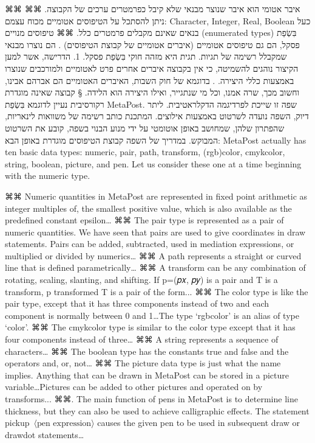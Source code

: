       ⌘⌘ איבר אטומי הוא איבר שנוצר מבנאי שלא קיבל כפרמטרים ערכים של הקבוצה.
      ⌘⌘ ניתן להסתכל על הטיפוסים אטומיים מכוח עצמם: Character, Integer, Real, Boolean כעל בנאים שאינם מקבלים פרמטרים כלל.
      ⌘⌘ טיפוסים מנויים (enumerated types) בִּשְׂפַת פסקל, הם גם טיפוסים אטומיים (איברים אטומיים של קבוצת הטיפוסים) . הם נוצרו מבנאי שמקבלל רשימה של תגיות. תגית היא מזהה חוקי בִּשְׂפַת פסקל.
      1. הדרישה, אשר למען הקיצור נוהגים להשמיטה, כי אין בקבוצה איברים אחרים פרט לאטומיים ולמורכבים שנוצרו באמצעות כללי היצירה. .
      בדוגמא של חוק השבות, האיברים האטומיים הם אברהם אבינו, וחשוב מכך, שרה אמנו, וכל מי שנתגייר, ואילו היצירה הוא הלידה.
      § קבוצה שאינה מוגדרת רקורסיבית
      נעיין לדוגמא בִּשְׂפַת MetaPost. שפה זו שייכת לפרדיגמה הדקלראטיבית. ליתר דיוק, השפה נועדה לשרטוט באמצעות אילוצים. המתכנת כותב רשימה של משוואות לינאריות, שהפתרון שלהן, שמחושב באופן אוטומטי על ידי מנוע הבנוי בשפה, קובע את השרטוט המבוקש.
      במדריך של השפה קבוצת הטיפוסים מוגדרת באופן הבא:
      MetaPost actually has ten basic data types: numeric, pair, path, transform, (rgb)color, cmykcolor, string, boolean, picture, and pen. Let us consider these one at a time beginning with the numeric type.
      \begin{enumerate}
      ⌘⌘ Numeric quantities in MetaPost are represented in fixed point arithmetic as integer multiples of, the smallest positive value, which is also available as the predefined constant epsilon…
      ⌘⌘ The pair type is represented as a pair of numeric quantities. We have seen that pairs are used to give coordinates in draw statements. Pairs can be added, subtracted, used in mediation expressions, or multiplied or divided by numerics…
      ⌘⌘ A path represents a straight or curved line that is defined parametrically…
      ⌘⌘ A transform can be any combination of rotating, scaling, slanting, and shifting. If p=(𝑝𝑥, 𝑝𝑦) is a pair and T is a transform,
      p transformed T
      is a pair of the form...
      ⌘⌘ The color type is like the pair type, except that it has three components instead of two and each component is normally between 0 and 1…The type ‘rgbcolor’ is an alias of type ‘color’.
      ⌘⌘ The cmykcolor type is similar to the color type except that it has four components instead of three…
      ⌘⌘ A string represents a sequence of characters…
      ⌘⌘ The boolean type has the constants true and false and the operators and, or, not…
      ⌘⌘ The picture data type is just what the name implies. Anything that can be drawn in MetaPost can be stored in a picture variable…Pictures can be added to other pictures and operated on by transforms...
      ⌘⌘. The main function of pens in MetaPost is to determine line thickness, but they can also be used to achieve calligraphic effects. The statement pickup~$⟨\text{pen expression}⟩$ causes the given pen to be used in subsequent draw or drawdot statements…

  \end{enumerate}

